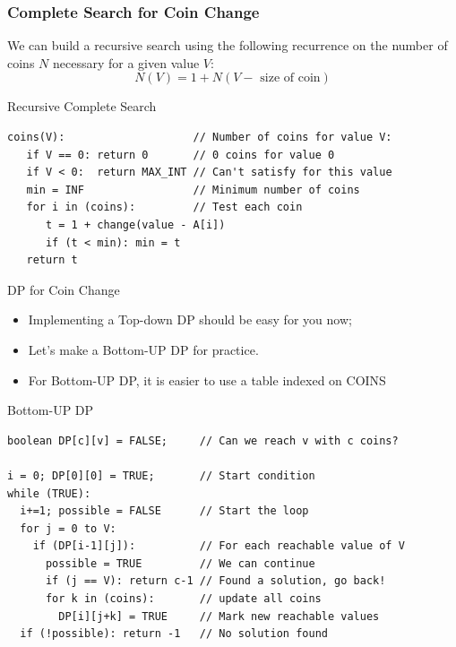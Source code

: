 \begin{frame}[fragile]
  \frametitle{Complete Search for Coin Change}

  We can build a recursive search using the following recurrence on the number of coins $N$ necessary for a given value $V$:
  \[N(V) = 1 + N(V-\text{ size of coin})\]

  \begin{block}{Recursive Complete Search}
    {\smaller
\begin{verbatim}
coins(V):                    // Number of coins for value V:
   if V == 0: return 0       // 0 coins for value 0
   if V < 0:  return MAX_INT // Can't satisfy for this value
   min = INF                 // Minimum number of coins
   for i in (coins):         // Test each coin
      t = 1 + change(value - A[i])
      if (t < min): min = t
   return t
\end{verbatim}
  }
  \end{block}
\end{frame}

\begin{frame}[fragile]{DP for Coin Change}
  \begin{itemize}
    \item Implementing a Top-down DP should be easy for you now;
    \item Let's make a Bottom-UP DP for practice.
    \item For Bottom-UP DP, it is easier to use a table indexed on COINS
  \end{itemize}

\begin{block}{Bottom-UP DP}
  {\smaller
\begin{verbatim}
boolean DP[c][v] = FALSE;     // Can we reach v with c coins?

i = 0; DP[0][0] = TRUE;       // Start condition
while (TRUE):
  i+=1; possible = FALSE      // Start the loop
  for j = 0 to V:
    if (DP[i-1][j]):          // For each reachable value of V
      possible = TRUE         // We can continue
      if (j == V): return c-1 // Found a solution, go back!
      for k in (coins):       // update all coins
        DP[i][j+k] = TRUE     // Mark new reachable values
  if (!possible): return -1   // No solution found
\end{verbatim}}
\end{block}
\end{frame}

